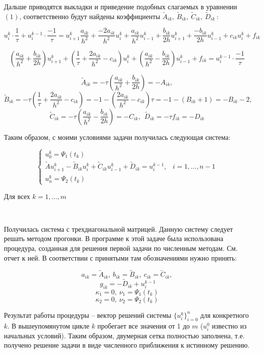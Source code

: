 \documentclass[12pt,a4paper]{article}
\begin{document}
Дальше приводятся выкладки и приведение подобных слагаемых в уравнении $(1)$, соответственно будут найдены коэффициенты $\tilde A_{ik},\ \tilde B_{ik},\ \tilde C_{ik},\ \tilde D_{ik}\ $:

$$
 u_i^k \cdot \frac{1}{\tau} + u_i^{k-1} \cdot \frac{-1}{\tau} =
 u_{i+1}^k \frac{a_{ik}}{h^2} + \frac{-2a_{ik}}{h^2} u_i^k + 
 \frac{a_{ik}}{h^2} u_{i-1}^k + \frac{b_{ik}}{2h} u_{i+1}^k +
 \frac{-b_{ik}}{2h} u_{i-1}^k + c_{ik} u_i^k + f_{ik}
$$

$$
 \left ( 
  \frac{a_{ik}}{h^2} + \frac{b_{ik}}{2h}
 \right )
 u_{i+1}^k
 +
 \left (
  \frac{1}{\tau} + \frac{2a_{ik}}{h^2} - c_{ik}
 \right )
 u_i^k
 +
 \left (
  \frac{a_{ik}}{h^2} - \frac{b_{ik}}{2h}
 \right )
 u_{i-1}^k
 + f_{ik}
 = u_i^{k-1} \cdot \frac{-1}{\tau}
$$

$$
 \tilde A_{ik} = -\tau \left (  \frac{a_{ik}}{h^2} + \frac{b_{ik}}{2h} \right )
 = - A_{ik},
$$
$$
 \tilde B_{ik} = -\tau  
 \left ( 
  \frac{1}{\tau} + \frac{2a_{ik}}{h^2} - c_{ik} 
 \right ) 
 = -1 - \left ( \frac{2a_{ik}}{h^2} - c_{ik} \right ) \tau
 = -1 - (B_{ik} + 1) = -B_{ik} - 2,
$$
$$
 \tilde C_{ik} = -\tau \left (  \frac{a_{ik}}{h^2} - \frac{b_{ik}}{2h} \right )
 = -C_{ik}, \ \ 
 \tilde  D_{ik} = -\tau f_{ik} = -D_{ik}
$$

Таким образом, с моими условиями задачи получилась следующая система:

$$
 \begin{cases}
  u_0^k = \Psi_1(t_k) 
  \\
  \tilde A u_{i+1}^k - \tilde B_{ik} u_i^k + \tilde C_{ik} u_{i-1}^k +
  \tilde D_{ik} = u_i^{k-1}, & i=1,...,n-1 
  \\ 
  u_n^k = \Psi_2(t_k)
 \end{cases}
$$

Для всех $k=1,...,m$

\

Получилась система с трехдиагональной матрицей. Данную систему следует решать методом прогонки. В программе к этой задаче была использована процедура, созданная для решения первой задачи по численным методам. См. отчет к ней. В соответствии с принятыми там обозначениями нужно принять:

$$ a_{ik} = \tilde A_{ik}, \ b_{ik} = \tilde B_{ik}, \ c_{ik} = \tilde C_{ik}, $$
$$  \ g_{ik} = -\tilde D_{ik} + u_i^{k-1} $$
$$ \kappa_1 = 0, \ \nu_1 = \Psi_1(t_k) $$
$$ \kappa_2 = 0, \ \nu_2 = \Psi_2(t_k) $$

Результат работы процедуры -- вектор решений системы $\{ u_i^k \}_{i=0}^n$ для конкретного $k$. В вышеупомянутом цикле $k$ пробегает все значения от 1 до $m$ ($u_i^0$ известно из начальных условий). Таким образом, двумерная сетка полностью заполнена, т.е. получено решение задачи в виде численного приближения к истинному решению. 
\end{document}
